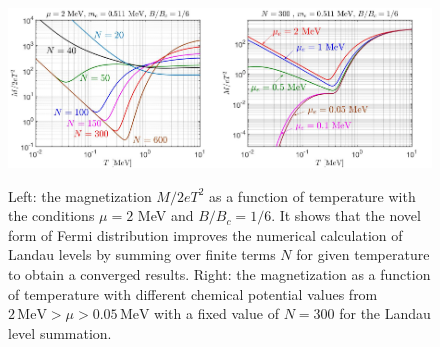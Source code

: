 \documentclass[sn-mathphys,Numbered]{sn-jnl}
\begin{document}
\begin{figure}[ht]
\centering
\includegraphics[width=0.5\textwidth]{./plot/NewFermi_Magnetization_tot003}\includegraphics[width=0.5\textwidth]{./plot/Magnetization_ChemicalPotential}
\caption{Left: the magnetization $M/2eT^2$ as a function of temperature with the conditions $\mu=2$ MeV and $B/B_c=1/6$. It shows that the novel form of Fermi distribution improves the numerical calculation of Landau levels by summing over finite terms $N$ for given temperature to obtain a converged results. Right: the magnetization as a function of temperature with different chemical potential values from $2\,\mathrm{MeV}>\mu>0.05\,\mathrm{MeV}$ with a fixed value of $N=300$ for the Landau level summation.}
\label{M_Checking001}
\end{figure}
\end{document}
